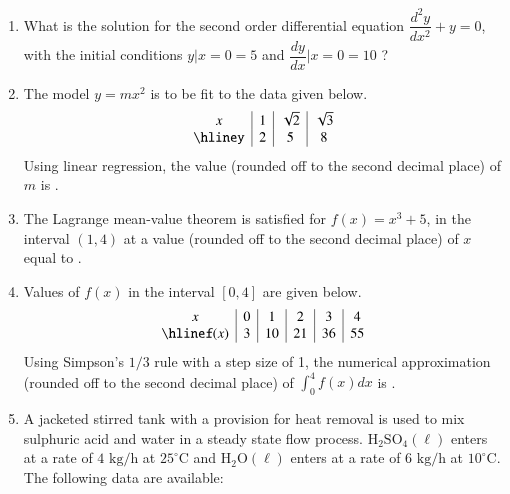 \documentclass[journal,12pt,onecolumn]{IEEEtran}
\theoremstyle{remark}
\begin{document}
\begin{enumerate}
\item What is the solution for the second order differential equation $\dfrac{d^2y}{dx^2} + y = 0$, with the initial conditions $y\big|{x=0} = 5$ and $\dfrac{dy}{dx}\bigg|{x=0} = 10$ ?
\hfill{}
\begin{enumerate}
\end{enumerate}

\item The model $y = mx^2$ is to be fit to the data given below.
\[\begin{array}{c|c|c|c}x & 1 & \sqrt{2} & \sqrt{3} \\\hliney & 2 & 5 & 8\end{array}\]
Using linear regression, the value (rounded off to the second decimal place) of $m$ is \underline{\hspace{1cm}}.
\hfill{}

\item The Lagrange mean-value theorem is satisfied for $f (x) = x^3 +5$, in the interval $(1,4)$ at a value (rounded off to the second decimal place) of $x$ equal to \underline{\hspace{1cm}}.
\hfill{}

\item Values of $f (x)$ in the interval $[0, 4]$ are given below.
\[\begin{array}{c|c|c|c|c|c}x & 0 & 1 & 2 & 3 & 4 \\\hlinef(x) & 3 & 10 & 21 & 36 & 55\end{array}\]
Using Simpson's $1/3$ rule with a step size of 1, the numerical approximation (rounded off to the second decimal place) of $\int_{0}^{4} f(x) dx$ is \underline{\hspace{1cm}}.
\hfill{}

\item A jacketed stirred tank with a provision for heat removal is used to mix sulphuric acid and water in a steady state flow process. $\text{H}_2\text{SO}_4 (\ell)$ enters at a rate of $4 \text{ kg/h}$ at $25^\circ\text{C}$ and $\text{H}_2\text{O} (\ell)$ enters at a rate of $6 \text{ kg/h}$ at $10^\circ\text{C}$. The following data are available:


\end{enumerate}
\end{document}
